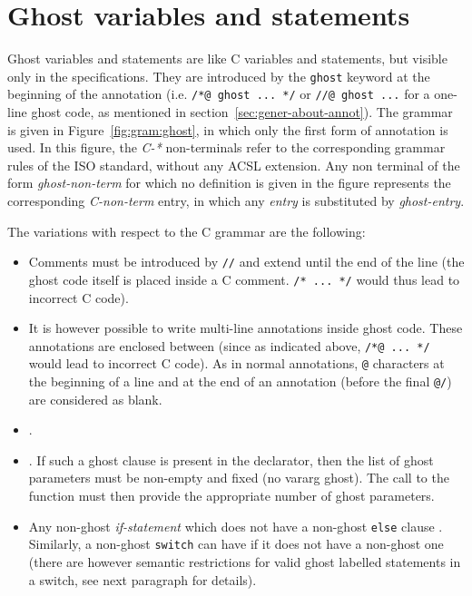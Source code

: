 \section{Ghost variables and statements}
\label{sec:ghost}
Ghost variables and statements are like C variables and statements,
but visible only in the specifications. They are introduced by the
\lstinline|ghost| keyword at the beginning of the annotation
(i.e. \lstinline|/*@ ghost ... */| or \lstinline|//@ ghost ...|
for a one-line
ghost code, as mentioned in section~\ref{sec:gener-about-annot}).
The grammar is given in Figure~\ref{fig:gram:ghost}, in which only the
first form of annotation is used. In this figure, the \textit{C-*}
non-terminals refer to the corresponding grammar rules of the ISO standard,
without any ACSL extension. Any non terminal of the form
\textit{ghost-non-term} for which no definition is given in the figure
represents the corresponding \textit{C-non-term} entry, in which any
\textit{entry} is substituted by \textit{ghost-entry}.

The variations with respect to the C
grammar are the following:
\begin{itemize}
\item Comments must be introduced by \lstinline|//| and extend until the
  end of the line (the ghost code itself is placed inside a C
  comment. \lstinline|/* ... */| would thus lead to incorrect C code).
\item It is however possible to write multi-line annotations inside ghost
  code. These annotations are enclosed between
  (since as indicated above, \lstinline|/*@ ... */| would lead
  to incorrect C code).
  As in normal annotations, \lstinline|@| characters at the beginning of a
  line and at the end of an annotation (before the final \lstinline|@/|) are
  considered as blank.
\item {}.
\item {}.
  If such a ghost
  clause is present in the declarator, then the list of ghost
  parameters must be non-empty and fixed (no vararg ghost). The call
  to the function must then provide the appropriate number of ghost parameters.
\item Any non-ghost \textit{if-statement} which does not have a non-ghost
  \lstinline|else| clause . Similarly, a non-ghost
  \lstinline|switch| can have 
  if it does not have a non-ghost one
  (there are however semantic restrictions for valid
  ghost labelled statements in a switch, see next paragraph for details).
\end{itemize}

